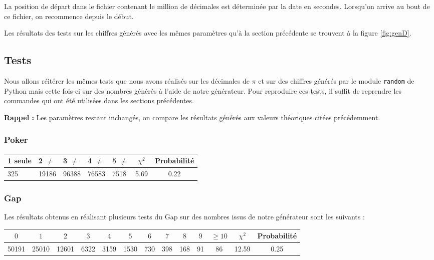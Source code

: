 \documentclass[12pt,a4paper]{article}
\begin{document}
La position de départ dans le fichier contenant le million de décimales
est déterminée par la date en secondes. Lorsqu'on arrive au bout de ce fichier,
on recommence depuis le début.

Les résultats des tests sur les chiffres générés avec les mêmes paramètres
qu'à la section précédente se trouvent à la figure \ref{fig:genD}.

\subsection{Tests}
Nous allons réitérer les mêmes tests que nous avons réalisés sur les décimales
de $\pi$ et sur des chiffres générés par le module \texttt{random} de Python
mais cette fois-ci sur des nombres générés à l'aide de notre générateur.
Pour reproduire ces tests, il suffit de reprendre les commandes qui ont été utilisées dans les sections précédentes.

\textbf{Rappel :} Les paramètres restant inchangés, on compare
les résultats générés aux valeurs théoriques citées précédemment.
\subsubsection{Poker}

\begin{center}
\begin{tabular}{l|l|l|l|l|c|c}
1 seule & 2 $\neq$ & 3 $\neq$ & 4 $\neq$ & 5 $\neq$
	& $\chi^2$ & Probabilité \\ \hline
325 & 19186 & 96388 & 76583 & 7518 &  5.69 &  0.22
\end{tabular}
\end{center}

\subsubsection{Gap}

Les résultats obtenus en réalisant plusieurs tests du Gap sur des nombres issus
de notre générateur sont les suivants :

\begin{center}
\begin{tabular}{c|c|c|c|c|c|c|c|c|c|c|c|c}
$0$ & $1$ & $2$ & $3$ & $4$ & $5$ & $6$ & $7$ & $8$ & $9$ & $\geq 10$ &
	$\chi^2$ & Probabilité \\ \hline
50191 & 25010 & 12601 & 6322 & 3159 & 1530 & 730 & 398 & 168 & 91 & 86 &
	12.59 &  0.25
\end{tabular}
\end{center}
\end{document}
